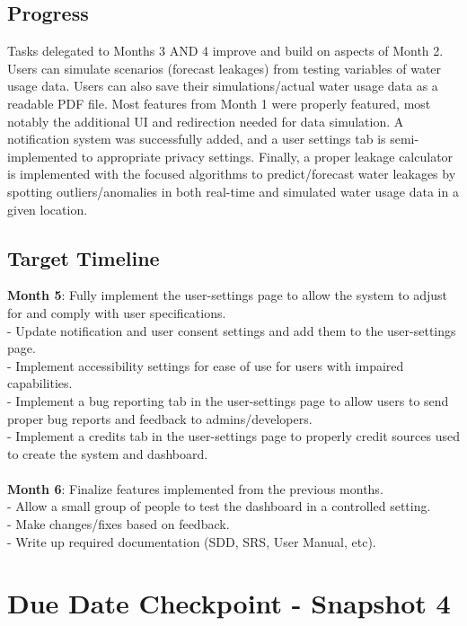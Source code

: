 \documentclass[10pt]{article}
\begin{document}
\subsection*{Progress}
Tasks delegated to Months 3 AND 4 improve and build on aspects of Month 2. Users can simulate scenarios (forecast leakages) from testing variables of water usage data. Users can also save their simulations/actual water usage data as a readable PDF file. Most features from Month 1 were properly featured, most notably the additional UI and redirection needed for data simulation. A notification system was successfully added, and a user settings tab is semi-implemented to appropriate privacy settings. Finally, a proper leakage calculator is implemented with the focused algorithms to predict/forecast water leakages by spotting outliers/anomalies in both real-time and simulated water usage data in a given location.
\subsection*{Target Timeline}
\textbf{Month 5}: Fully implement the user-settings page to allow the system to adjust for and comply with user specifications.\\
- Update notification and user consent settings and add them to the user-settings page.\\
- Implement accessibility settings for ease of use for users with impaired capabilities.\\
- Implement a bug reporting tab in the user-settings page to allow users to send proper bug reports and feedback to admins/developers.\\
- Implement a credits tab in the user-settings page to properly credit sources used to create the system and dashboard.\\
\\\textbf{Month 6}: Finalize features implemented from the previous months.\\
- Allow a small group of people to test the dashboard in a controlled setting.\\
- Make changes/fixes based on feedback.\\
- Write up required documentation (SDD, SRS, User Manual, etc).

\newpage

\section*{Due Date Checkpoint - Snapshot 4}
\end{document}
